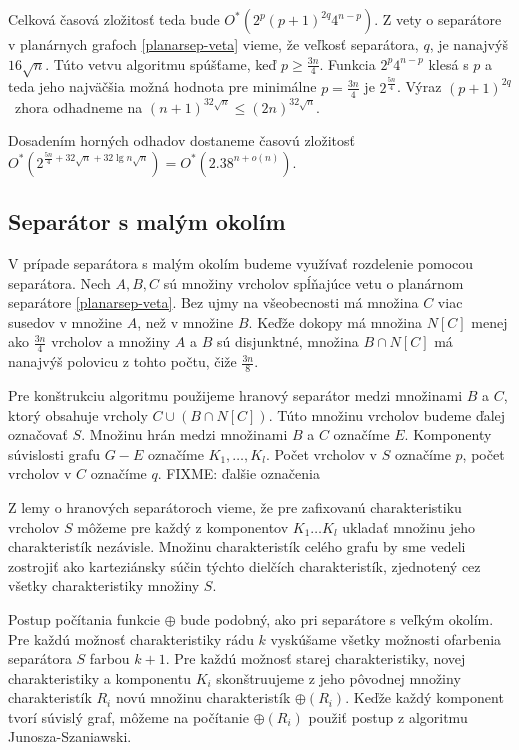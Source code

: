 Celková časová
zložitosť teda bude $O^*(2^p (p+1)^{2q} 4^{n-p})$. Z vety o separátore v planárnych grafoch \ref{planarsep-veta}
vieme, že veľkosť separátora, $q$, je nanajvýš $16\sqrt{n}$. Túto vetvu algoritmu spúšťame, keď $p \ge \frac{3n}{4}$.
Funkcia $2^p 4^{n-p}$ klesá s $p$ a teda jeho najväčšia možná hodnota pre minimálne $p = \frac{3n}{4}$ je
$2^{\frac{5n}{4}}$. Výraz $(p+1)^{2q}$ zhora odhadneme na $(n+1)^{32\sqrt{n}} \leq (2n)^{32\sqrt{n}}$.

Dosadením horných odhadov dostaneme časovú zložitosť $O^*(2^{\frac{5n}{4} + 32\sqrt{n} + 32\lg{n}\sqrt{n}}) = O^*(2.38^{n + o(n)})$.

\subsection{Separátor s malým okolím}

V prípade separátora s malým okolím budeme využívať rozdelenie pomocou separátora. Nech $A, B, C$ sú množiny
vrcholov spĺňajúce vetu o planárnom separátore \ref{planarsep-veta}. Bez ujmy na všeobecnosti má množina $C$
viac susedov v množine $A$, než v množine $B$. Keďže dokopy má množina $N[C]$ menej ako $\frac{3n}{4}$ vrcholov
a množiny $A$ a $B$ sú disjunktné, množina $B \cap N[C]$ má nanajvýš polovicu z tohto počtu, čiže $\frac{3n}{8}$.

Pre konštrukciu algoritmu použijeme hranový separátor medzi množinami $B$ a $C$, ktorý obsahuje vrcholy
$C \cup (B \cap N[C])$. Túto množinu vrcholov budeme ďalej označovať $S$. Množinu hrán medzi množinami
$B$ a $C$ označíme $E$. Komponenty súvislosti grafu $G-E$ označíme $K_1, \ldots, K_l$. Počet vrcholov v $S$
označíme $p$, počet vrcholov v $C$ označíme $q$. FIXME: ďalšie označenia

Z lemy o hranových separátoroch vieme, že pre zafixovanú charakteristiku vrcholov $S$ môžeme pre každý
z komponentov $K_1 \ldots K_l$ ukladať množinu jeho charakteristík nezávisle. Množinu charakteristík
celého grafu by sme vedeli zostrojiť ako karteziánsky súčin týchto dielčích charakteristík, zjednotený cez
všetky charakteristiky množiny $S$.

Postup počítania funkcie $\oplus$ bude podobný, ako pri separátore s veľkým okolím. Pre každú možnosť
charakteristiky rádu $k$ vyskúšame všetky možnosti ofarbenia separátora $S$ farbou $k+1$. Pre každú
možnosť starej charakteristiky, novej charakteristiky a komponentu $K_i$ skonštruujeme z jeho pôvodnej
množiny charakteristík $R_i$ novú množinu charakteristík $\oplus(R_i)$. Keďže každý komponent tvorí súvislý
graf, môžeme na počítanie $\oplus(R_i)$ použiť postup z algoritmu Junosza-Szaniawski.

